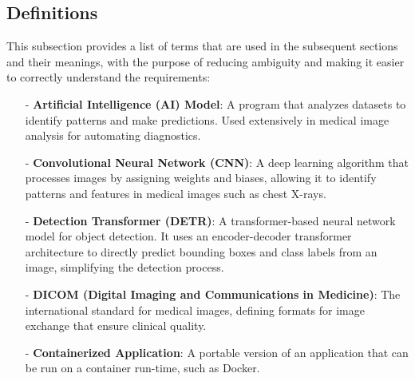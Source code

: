 \documentclass[12pt, titlepage]{article}
\begin{document}
\subsection{Definitions}
This subsection provides a list of terms that are used in the subsequent sections and their meanings, with the purpose of reducing ambiguity and making it easier to correctly understand the requirements:

\begin{itemize}
    
    
    \item[-] \textbf{Artificial Intelligence (AI) Model}: A program that analyzes datasets to identify patterns and make predictions. Used extensively in medical image analysis for automating diagnostics. 
    
    \item[-] \textbf{Convolutional Neural Network (CNN)}: A deep learning algorithm that processes images by assigning weights and biases, allowing it to identify patterns and features in medical images such as chest X-rays.
    
    \item[-] \textbf{Detection Transformer (DETR)}: A transformer-based neural network model for object detection. It uses an encoder-decoder transformer architecture to directly predict bounding boxes and class labels from an image, simplifying the detection process.
    
    \item[-] \textbf{DICOM (Digital Imaging and Communications in Medicine)}: The international standard for medical images, defining formats for image exchange that ensure clinical quality.
    
    \item[-] \textbf{Containerized Application}: A portable version of an application that can be run on a container run-time, such as Docker.
  

\end{itemize}
\end{document}
